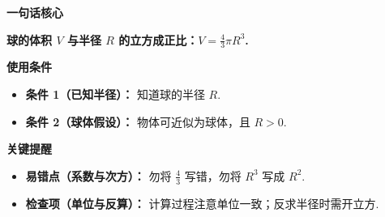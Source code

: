 \begin{summarybox}
	\textbf{\textcolor{CSummary}{一句话核心}}

	\textbf{球的体积 $V$ 与半径 $R$ 的立方成正比：$V = \frac{4}{3}\pi R^3$.}

	\medskip
	\textbf{\textcolor{CSummary}{使用条件}}
	\begin{itemize}[leftmargin=*, itemsep=0.5em, topsep=0.4em]
		\item \textbf{条件 1（已知半径）：} 知道球的半径 $R$.
		\item \textbf{条件 2（球体假设）：} 物体可近似为球体，且 $R>0$.
	\end{itemize}

	\medskip
	\textbf{\textcolor{CSummary}{关键提醒}}
	\begin{itemize}[leftmargin=*, itemsep=0.5em, topsep=0.4em]
		\item \textbf{易错点（系数与次方）：} 勿将 $\frac{4}{3}$ 写错，勿将 $R^3$ 写成 $R^2$.
		\item \textbf{检查项（单位与反算）：} 计算过程注意单位一致；反求半径时需开立方.
	\end{itemize}
\end{summarybox}
